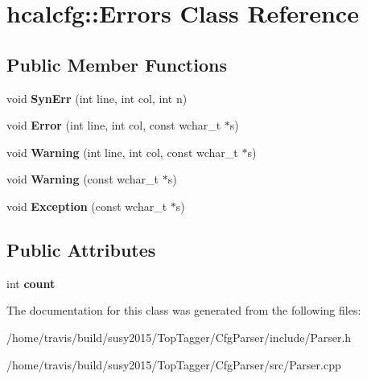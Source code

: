 \hypertarget{classhcalcfg_1_1Errors}{\section{hcalcfg\-:\-:Errors Class Reference}
\label{classhcalcfg_1_1Errors}
}
\subsection*{Public Member Functions}
\begin{DoxyCompactItemize}
\item 
\hypertarget{classhcalcfg_1_1Errors_aadf51ffffaf63b6631be27497cef691e}{void {\bfseries Syn\-Err} (int line, int col, int n)}\label{classhcalcfg_1_1Errors_aadf51ffffaf63b6631be27497cef691e}

\item 
\hypertarget{classhcalcfg_1_1Errors_a7ec37002c80b092716799a1b83b77f4c}{void {\bfseries Error} (int line, int col, const wchar\-\_\-t $\ast$s)}\label{classhcalcfg_1_1Errors_a7ec37002c80b092716799a1b83b77f4c}

\item 
\hypertarget{classhcalcfg_1_1Errors_a8782ed816d70b9455df23f9b0b7d9f1c}{void {\bfseries Warning} (int line, int col, const wchar\-\_\-t $\ast$s)}\label{classhcalcfg_1_1Errors_a8782ed816d70b9455df23f9b0b7d9f1c}

\item 
\hypertarget{classhcalcfg_1_1Errors_a0de033b0829bbd7b0e53f92249dde549}{void {\bfseries Warning} (const wchar\-\_\-t $\ast$s)}\label{classhcalcfg_1_1Errors_a0de033b0829bbd7b0e53f92249dde549}

\item 
\hypertarget{classhcalcfg_1_1Errors_a9b4437d7f820fe03d1a7ae84a20830d7}{void {\bfseries Exception} (const wchar\-\_\-t $\ast$s)}\label{classhcalcfg_1_1Errors_a9b4437d7f820fe03d1a7ae84a20830d7}

\end{DoxyCompactItemize}
\subsection*{Public Attributes}
\begin{DoxyCompactItemize}
\item 
\hypertarget{classhcalcfg_1_1Errors_aa493a10b51d31629b0224656871320ee}{int {\bfseries count}}\label{classhcalcfg_1_1Errors_aa493a10b51d31629b0224656871320ee}

\end{DoxyCompactItemize}


The documentation for this class was generated from the following files\-:\begin{DoxyCompactItemize}
\item 
/home/travis/build/susy2015/\-Top\-Tagger/\-Cfg\-Parser/include/Parser.\-h\item 
/home/travis/build/susy2015/\-Top\-Tagger/\-Cfg\-Parser/src/Parser.\-cpp\end{DoxyCompactItemize}
